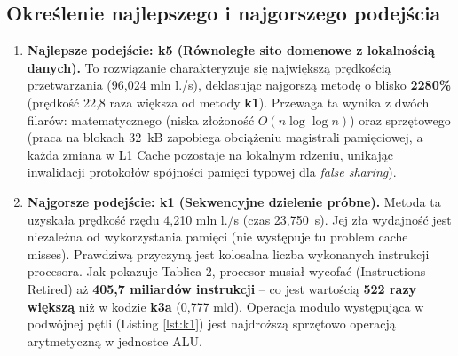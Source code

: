 \documentclass[10pt]{article}
\begin{document}
\subsection{Określenie najlepszego i najgorszego podejścia}
\begin{enumerate}
    \item \textbf{Najlepsze podejście: k5 (Równoległe sito domenowe z lokalnością danych).}
    To rozwiązanie charakteryzuje się największą prędkością przetwarzania (96,024 mln l./s), deklasując najgorszą metodę o blisko \textbf{2280\%} 
	(prędkość 22,8 raza większa od metody \textbf{k1}). Przewaga ta wynika z dwóch filarów: matematycznego (niska złożoność $O(n \log \log n)$) oraz sprzętowego
	 (praca na blokach 32~kB zapobiega obciążeniu magistrali pamięciowej, a każda zmiana w L1 Cache pozostaje na lokalnym rdzeniu, unikając inwalidacji protokołów
	  spójności pamięci typowej dla \textit{false sharing}).
    
    \item \textbf{Najgorsze podejście: k1 (Sekwencyjne dzielenie próbne).}
    Metoda ta uzyskała prędkość rzędu 4,210 mln l./s (czas 23,750~s). Jej zła wydajność jest niezależna od wykorzystania pamięci (nie występuje tu problem cache misses).
	 Prawdziwą przyczyną jest kolosalna liczba wykonanych instrukcji procesora. Jak pokazuje Tablica 2, procesor musiał wycofać (Instructions Retired) aż 
	 \textbf{405,7 miliardów instrukcji} – co jest wartością \textbf{522 razy większą} niż w kodzie \textbf{k3a} (0,777 mld). Operacja modulo
	 występująca w podwójnej pętli (Listing \ref{lst:k1}) jest najdroższą sprzętowo operacją arytmetyczną w jednostce ALU.
\end{enumerate}
\end{document}
